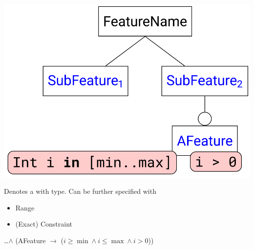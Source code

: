 \documentclass[
    ../../Software_Engineering_Summary.tex,
]
{subfiles}
\begin{document}
\begin{minipage}
    [c]{0.35\textwidth}
    \centering
    \includegraphics[width = \textwidth]{Pics/12/FeatureDiagramParameter.png}
\end{minipage}
\begin{minipage}
    [c]{0.65\textwidth}
    Denotes a  with type. Can be further specified with
    \begin{itemize}
        \item Range
        \item (Exact) Constraint
    \end{itemize}
    \begin{defbox}
        \dots $\land$ (AFeature $\rightarrow$ ($i \geq \min \land  i \leq \max \land  i > 0$))
    \end{defbox}
\end{minipage}
\end{document}
